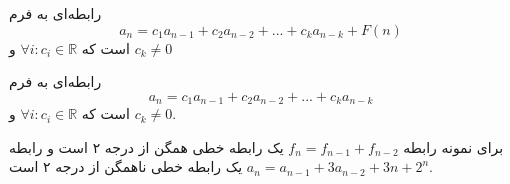 \begin{DEFINITION}
    \p
    رابطه‌ای به فرم
   \[a_n=c_{1}a_{n-1}+c_{2}a_{n-2}+...+c_{k}a_{n-k}+F(n)\]
   است که
   $\forall{i}:c_i \in \mathbb{R} $
   و 
   $ c_k\neq 0$

\end{DEFINITION}

 \begin{DEFINITION}
    \p
    رابطه‌ای به فرم
   \[a_n=c_{1}a_{n-1}+c_{2}a_{n-2}+...+c_{k}a_{n-k}\]
   است که
   $\forall{i}:c_i \in \mathbb{R} $
   و 
   $ c_k\neq 0$.


\end{DEFINITION}

\p
برای نمونه رابطه‌ 
$f_n=f_{n-1}+f_{n-2}$
یک رابطه‌ خطی همگن از درجه ۲ است و رابطه‌ 
$a_n=a_{n-1}+3a_{n-2}+3n+2^n$
یک رابطه‌ خطی ناهمگن از درجه ۲ است.
